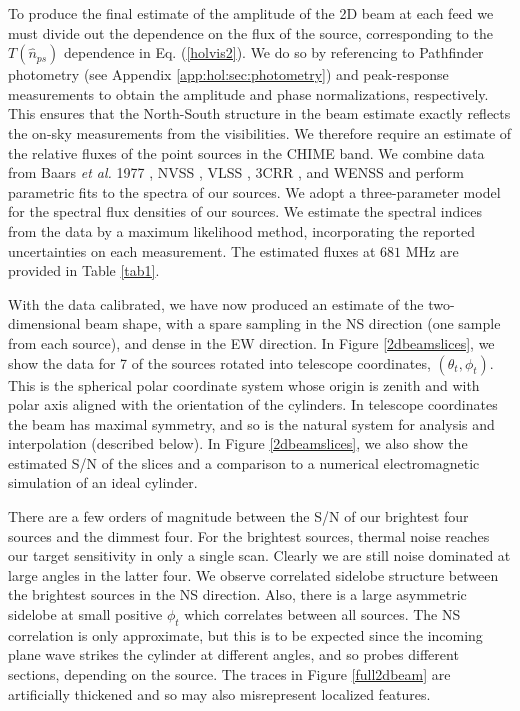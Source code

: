 To produce the final estimate of the amplitude of the 2D beam at each feed we must divide out the dependence on the flux of the source, corresponding to the $T(\hat{n}_{ps})$ dependence in Eq. (\ref{holvis2}). We do so by referencing to Pathfinder photometry (see Appendix \ref{app:hol:sec:photometry}) and peak-response measurements to obtain the amplitude and phase normalizations, respectively. This ensures that the North-South structure in the beam estimate exactly reflects the on-sky measurements from the visibilities. We therefore require an estimate of the relative fluxes of the point sources in the CHIME band. We combine data from Baars {\it et al.} 1977 \citep{baars}, NVSS \citep{NVSS}, VLSS \citep{VLSS}, 3CRR \citep{3CRR}, and WENSS \citep{WENSS} and perform parametric fits to the spectra of our sources. We adopt a three-parameter model for the spectral flux densities of our sources. We estimate the spectral indices from the data by a maximum likelihood method, incorporating the reported uncertainties on each measurement. The estimated fluxes at $681$ MHz are provided in Table \ref{tab1}.

With the data calibrated, we have now produced an estimate of the two-dimensional beam shape, with a spare sampling in the NS direction (one sample from each source), and dense in the EW direction. In Figure \ref{2dbeamslices}, we show the data for 7 of the sources rotated into telescope coordinates, $(\theta_t, \phi_t)$. This is the spherical polar coordinate system whose origin is zenith and with polar axis aligned with the orientation of the cylinders. In telescope coordinates the beam has maximal symmetry, and so is the natural system for analysis and interpolation (described below). In Figure \ref{2dbeamslices}, we also show the estimated S/N of the slices and a comparison to a numerical electromagnetic simulation of an ideal cylinder.

There are a few orders of magnitude between the S/N of our brightest four sources and the dimmest four. For the brightest sources, thermal noise reaches our target sensitivity \citep{mmodes2} in only a single scan. Clearly we are still noise dominated at large angles in the latter four. We observe correlated sidelobe structure between the brightest sources in the NS direction. Also, there is a large asymmetric sidelobe at small positive $\phi_t$ which correlates between all sources. The NS correlation is only approximate, but this is to be expected since the incoming plane wave strikes the cylinder at different angles, and so probes different sections, depending on the source. The traces in Figure \ref{full2dbeam} are artificially thickened and so may also misrepresent localized features.

